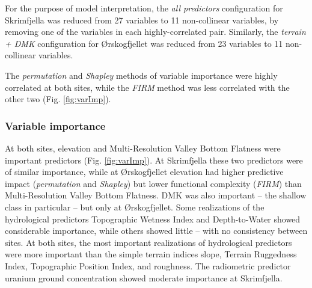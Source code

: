 \documentclass[soil, manuscript]{copernicus}
\begin{document}
For the purpose of model interpretation, the \emph{all predictors} configuration for Skrimfjella was reduced from 27 variables to 11 non-collinear variables, by removing one of the variables in each highly-correlated pair.
Similarly, the \emph{terrain + DMK} configuration for Ørskogfjellet was reduced from 23 variables to 11 non-collinear variables.

The \emph{permutation} and \emph{Shapley} methods of variable importance were highly correlated at both sites, while the \emph{FIRM} method was less correlated with the other two (Fig. \ref{fig:varImp}).

\subsubsection{Variable importance}

At both sites, elevation and Multi-Resolution Valley Bottom Flatness were important predictors (Fig. \ref{fig:varImp}).
At Skrimfjella these two predictors were of similar importance, while at Ørskogfjellet elevation had higher predictive impact (\emph{permutation} and \emph{Shapley}) but lower functional complexity (\emph{FIRM}) than Multi-Resolution Valley Bottom Flatness.
DMK was also important -- the shallow class in particular -- but only at Ørskogfjellet.
Some realizations of the hydrological predictors Topographic Wetness Index and Depth-to-Water showed considerable importance, while others showed little -- with no consistency between sites.
At both sites, the most important realizations of hydrological predictors were more important than the simple terrain indices slope, Terrain Ruggedness Index, Topographic Position Index, and roughness.
The radiometric predictor uranium ground concentration showed moderate importance at Skrimfjella.
\end{document}
